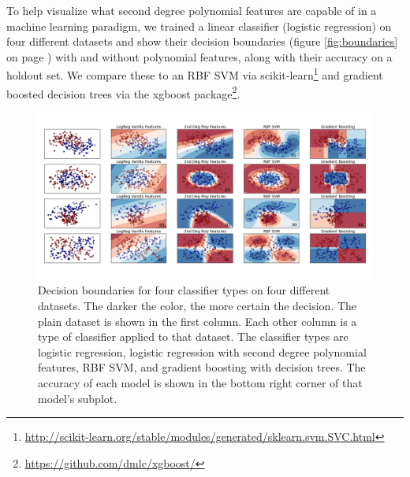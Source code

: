 \documentclass[11pt,twocolumn]{article}
\begin{document}
To help visualize what second degree polynomial features are capable of in a machine learning paradigm,
we trained a linear classifier (logistic regression) on four different datasets and show their decision
boundaries (figure \eqref{fig:boundaries} on page \pageref{fig:boundaries}) with and without polynomial features, along with their accuracy on a holdout set. We compare
these to an RBF SVM via scikit-learn\footnote{\url{http://scikit-learn.org/stable/modules/generated/sklearn.svm.SVC.html}} 
and gradient boosted decision trees via the xgboost package\footnote{\url{https://github.com/dmlc/xgboost/}}.

\begin{figure}
    \centering
    \includegraphics[scale=0.5]{classifier_boundaries.png}
    \caption{Decision boundaries for four classifier types on four different datasets. The darker the color, the more certain the decision.
             The plain dataset is shown in the first column. Each other column is a type of classifier applied to that dataset. The classifier
             types are logistic regression, logistic regression with second degree polynomial features, RBF SVM, and gradient boosting with decision trees.
             The accuracy of each model is shown in the bottom right corner of that model's subplot.}
    \label{fig:boundaries}
\end{figure}

\end{document}
